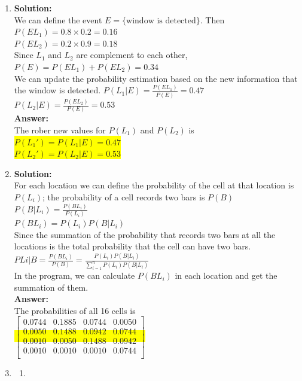 \documentclass{article}
\newcommand{\myansw}{\textbf{Answer:}\\}
\newcommand{\mysolu}{\textbf{Solution:}\\}
\begin{document}
\begin{enumerate}
\begin{enumerate}
	\end{enumerate}
	\item
	\mysolu
	We can define the event ${E=\{\text{window is detected}\}}$. Then\\
	${P(EL_1)=0.8\times 0.2=0.16}$\\
	${P(EL_2)=0.2\times 0.9=0.18}$\\
	Since ${L_1}$ and ${L_2}$ are complement to each other,\\
	${P(E)=P(EL_1)+P(EL_2)=0.34}$\\
	We can update the probability estimation based on the new information that the window is detected.
	${P(L_1|E)=\frac{P(EL_1)}{P(E)}=0.47}$\\
	${P(L_2|E)=\frac{P(EL_2)}{P(E)}=0.53}$\\
	\myansw
	The rober new values for ${P(L_1)}$ and ${P(L_2)}$ is\\
	\colorbox{yellow}{
		${P(L_1')=P(L_1|E)=0.47}$
	}\\
	\colorbox{yellow}{
		${P(L_2')=P(L_2|E)=0.53}$
	}\\
	\item
	\mysolu
	For each location we can define the probability of the cell at that location is ${P(L_i)}$; the probability of a cell records two bars is ${P(B)}$\\
	${P(B|L_i)=\frac{P(BL_i)}{P(L_i)}}$\\
	${P(BL_i)=P(L_i)P(B|L_i)}$\\
	Since the summation of the probability that records two bars at all the locations is the total probability that the cell can have two bars.\\
	${P{Li|B}=\frac{P(BL_i)}{P(B)}=\frac{P(L_i)P(B|L_i)}{\sum\limits_{i=1}^n P(L_i)P(B|L_i)}}$\\
	In the program, we can calculate ${P(BL_i)}$ in each location and get the summation of them.\\
	\myansw
	The probabilities of all 16 cells is\\
	\colorbox{yellow}{
		$\begin{bmatrix}
			0.0744&0.1885&0.0744&0.0050\\
			0.0050&0.1488&0.0942&0.0744\\
			0.0010&0.0050&0.1488&0.0942\\
			0.0010&0.0010&0.0010&0.0744\\
		\end{bmatrix}$
	}
	\item
	\begin{enumerate}
		\item

\end{enumerate}
\end{enumerate}
\end{document}
